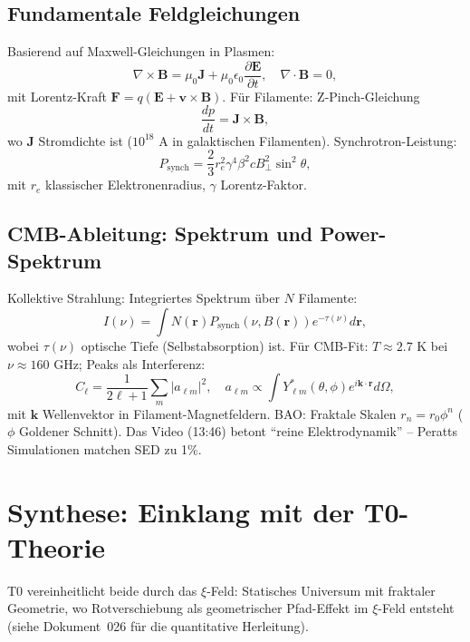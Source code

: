 	\subsection{Fundamentale Feldgleichungen}
	Basierend auf Maxwell-Gleichungen in Plasmen:
	\begin{equation}
		\nabla \times \mathbf{B} = \mu_0 \mathbf{J} + \mu_0 \epsilon_0 \frac{\partial \mathbf{E}}{\partial t}, \quad \nabla \cdot \mathbf{B} = 0,
	\end{equation}
	mit Lorentz-Kraft $\mathbf{F} = q(\mathbf{E} + \mathbf{v} \times \mathbf{B})$. Für Filamente: Z-Pinch-Gleichung
	\begin{equation}
		\frac{dp}{dt} = \mathbf{J} \times \mathbf{B},
	\end{equation}
	wo $\mathbf{J}$ Stromdichte ist ($10^{18}$ A in galaktischen Filamenten). Synchrotron-Leistung:
	\begin{equation}
		P_{\text{synch}} = \frac{2}{3} r_e^2 \gamma^4 \beta^2 c B_\perp^2 \sin^2 \theta,
	\end{equation}
	mit $r_e$ klassischer Elektronenradius, $\gamma$ Lorentz-Faktor.
	\subsection{CMB-Ableitung: Spektrum und Power-Spektrum}
	Kollektive Strahlung: Integriertes Spektrum über $N$ Filamente:
	\begin{equation}
		I(\nu) = \int N(\mathbf{r}) P_{\text{synch}}(\nu, B(\mathbf{r})) e^{-\tau(\nu)} d\mathbf{r},
	\end{equation}
	wobei $\tau(\nu)$ optische Tiefe (Selbstabsorption) ist. Für CMB-Fit: $T \approx 2.7$ K bei $\nu \approx 160$ GHz; Peaks als Interferenz:
	\begin{equation}
		C_\ell = \frac{1}{2\ell + 1} \sum_m |a_{\ell m}|^2, \quad a_{\ell m} \propto \int Y_{\ell m}^*(\theta, \phi) e^{i \mathbf{k} \cdot \mathbf{r}} d\Omega,
	\end{equation}
	mit $\mathbf{k}$ Wellenvektor in Filament-Magnetfeldern. BAO: Fraktale Skalen $r_n = r_0 \phi^n$ ($\phi$ Goldener Schnitt).
	Das Video (13:46) betont ``reine Elektrodynamik'' -- Peratts Simulationen matchen SED zu 1\%.
	\section{Synthese: Einklang mit der T0-Theorie}
	T0 vereinheitlicht beide durch das $\xi$-Feld: Statisches Universum mit fraktaler Geometrie, wo Rotverschiebung als geometrischer Pfad-Effekt im $\xi$-Feld entsteht (siehe Dokument~026 für die quantitative Herleitung).
